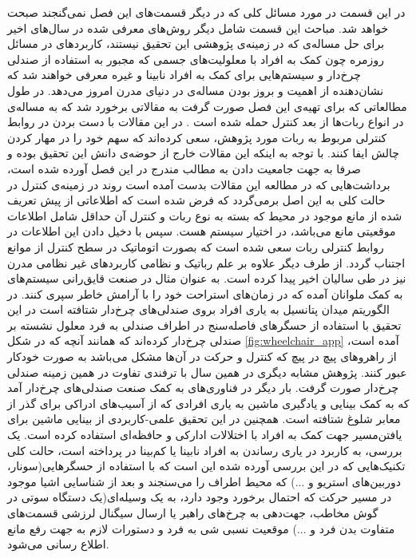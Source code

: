 در این قسمت در مورد مسائل کلی که در دیگر قسمت‌های این فصل نمی‌گنجند صبحت خواهد شد. مباحث این قسمت شامل دیگر روش‌های معرفی شده در سال‌های اخیر برای حل مساله‌ی  که در زمینه‌ی پژوهشی این تحقیق نیستند، کاربردهای  در مسائل روزمره چون کمک به افراد با معلولیت‌های جسمی که مجبور به استفاده از صندلی چرخ‌دار و سیستم‌هایی برای کمک به افراد نابینا و غیره معرفی خواهند شد که نشان‌دهنده‌ از اهمیت و بروز بودن مساله‌ی  در دنیای مدرن امروز می‌دهد.
در طول مطالعاتی که برای تهیه‌ی این فصل صورت گرفت به مقالاتی برخورد شد که به مساله‌ی  در انواع ربات‌ها از بعد کنترل حمله شده است
\cite{geng2013obstacle, dong2015obstacle, yao2015real, yang2016nonlinear}.
در این مقالات با دست بردن در روابط کنترلی مربوط به ربات مورد پژوهش، سعی کرده‌اند که سهم خود را در مهار کردن چالش  ایفا کنند. با توجه به اینکه این مقالات خارج از حوضه‌ی دانش این تحقیق بوده و صرفا به جهت جامعیت دادن به مطالب مندرج در این فصل آورده شده است، برداشت‌هایی که در مطالعه این مقالات بدست آمده است روند  در زمینه‌ی کنترل در حالت کلی به این اصل برمی‌گردد که فرض شده است که اطلاعاتی از پیش تعریف شده از مانع موجود در محیط که بسته به نوع ربات و کنترل آن حداقل شامل اطلاعات موقعیتی مانع می‌باشد، در اختیار سیستم هست. سپس با دخیل دادن این اطلاعات در روابط کنترلی ربات سعی شده است که بصورت اتوماتیک در سطح کنترل از موانع اجتناب گردد.
از طرف دیگر  علاوه بر علم رباتیک و نظامی کاربردهای غیر نظامی مدرن نیز در طی سالیان اخیر پیدا کرده است. به عنوان مثال در صنعت قایق‌رانی سیستم‌های  به کمک ملوانان آمده که در زمان‌های استراحت خود را با آرامش خاطر سپری کنند.
در  الگوریتم میدان پتانسیل به یاری افراد بروی صندلی‌های چرخ‌دار شتافته است در این تحقیق با استفاده از حسگرهای فاصله‌سنج در اطراف صندلی به فرد معلول نشسته بر صندلی چرخ‌دار کرده‌اند که همانند آنچه که در شکل \ref{fig:wheelchair_app} آمده است، از راهروهای پیچ در پیچ که کنترل و حرکت در آن‌ها مشکل می‌باشد به صورت خودکار عبور کنند. پژوهش مشابه دیگری در همین سال با ترفندی تفاوت در همین زمینه‌ صندلی چرخ‌دار صورت گرفت.
بار دیگر در  فناوری‌های  به کمک صنعت صندلی‌های چرخ‌دار آمد که به کمک بینایی و یادگیری ماشین به یاری افرادی که از آسیب‌های ادراکی برای گذر از معابر شلوغ شتافته است. همچنین در این تحقیق علمی-کاربردی از بینایی ماشین برای یافتن‌مسیر جهت کمک به افراد با اختلالات ادارکی و حافظه‌ای استفاده کرده است. یک بررسی، به کاربرد  در یاری رساندن به افراد نابینا یا کم‌بینا در  پرداخته است، حالت کلی تکنیک‌هایی که در این بررسی آورده شده این است که با استفاده از حسگر‌هایی(سونار، دوربین‌های استریو و ...) که محیط اطراف را می‌سنجند و بعد از شناسایی اشیا موجود در مسیر حرکت که احتمال برخورد وجود دارد، به یک وسیله‌ای(یک دستگاه سوتی در گوش مخاطب، جهت‌دهی به چرخ‌های راهبر یا ارسال سیگنال لرزشی قسمت‌های متفاوت بدن فرد و ...) موقعیت نسبی شی به فرد و دستورات لازم به جهت رفع مانع اطلاع رسانی می‌شود.

